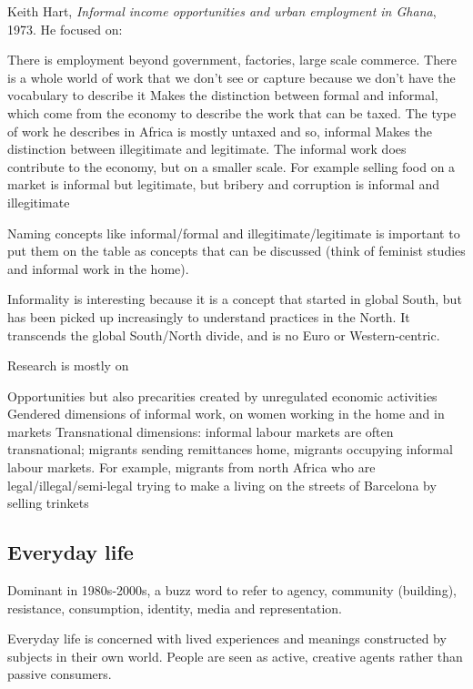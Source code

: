 \documentclass{article}
\begin{document}
Keith Hart, \textit{Informal income opportunities and urban employment in Ghana}, 1973. He focused on:

\begin{outline}
	\1 There is employment beyond government, factories, large scale commerce. There is a whole world of work that we don't see or capture because we don't have the vocabulary to describe it
	\1 Makes the distinction between formal and informal, which come from the economy to describe the work that can be taxed. The type of work he describes in Africa is mostly untaxed and so, informal
	\1 Makes the distinction between illegitimate and legitimate. The informal work does contribute to the economy, but on a smaller scale. For example selling food on a market is informal but legitimate, but bribery and corruption is informal and illegitimate
\end{outline}

Naming concepts like informal/formal and illegitimate/legitimate is important to put them on the table as concepts that can be discussed (think of feminist studies and informal work in the home).

Informality is interesting because it is a concept that started in global South, but has been picked up increasingly to understand practices in the North. It transcends the global South/North divide, and is no Euro or Western-centric.

Research is mostly on 

\begin{outline}
	\1 Opportunities but also precarities created by unregulated economic activities
	\1 Gendered dimensions of informal work, on women working in the home and in markets
	\1 Transnational dimensions: informal labour markets are often transnational; migrants sending remittances home, migrants occupying informal labour markets. For example, migrants from north Africa who are legal/illegal/semi-legal trying to make a living on the streets of Barcelona by selling trinkets
\end{outline}

\subsection{Everyday life}

Dominant in 1980s-2000s, a buzz word to refer to agency, community (building), resistance, consumption, identity, media and representation.

Everyday life is concerned with lived experiences and meanings constructed by subjects in their own world. 
People are seen as active, creative agents rather than passive consumers.
\end{document}
